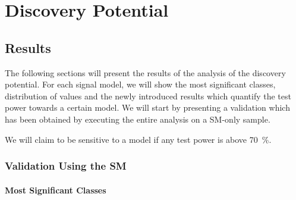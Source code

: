 
\chapter{Discovery Potential}
\label{chap:sensitivity_studies}

\section{Results}
\label{sec:results}

The following sections will present the results of the analysis of the discovery potential. For each signal model, we will show the most significant classes, distribution of \ptilde values and the newly introduced \phat results which quantify the test power towards a certain model. 
We will start by presenting a validation which has been obtained by executing the entire analysis on a \ac{SM}-only sample.


We will claim to be sensitive to a model if any \phat test power is above \SI{70}{\percent}.

\subsection{Validation Using the \ac{SM}}
\subsubsection{Most Significant Classes}
%    
%
